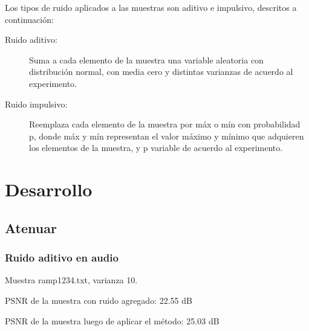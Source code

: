 \documentclass[a4paper,10pt,twoside]{article}
\begin{document}
Los tipos de ruido aplicados a las muestras son aditivo e impulsivo, descritos a continuación:

\begin{description}

\item[Ruido aditivo:]

Suma a cada elemento de la muestra una variable aleatoria con distribución normal, con media cero y distintas varianzas de acuerdo al experimento.

\item[Ruido impulsivo:]

Reemplaza cada elemento de la muestra por máx o mín con probabilidad p, donde máx y mín representan el valor máximo y mínimo que adquieren los elementos de la muestra, y p variable de acuerdo al experimento.

\end{description}








\section{Desarrollo}


\subsection{Atenuar}


\subsubsection{Ruido aditivo en audio}

Muestra ramp1234.txt, varianza 10.

PSNR de la muestra con ruido agregado: 22.55 dB

PSNR de la muestra luego de aplicar el método: 25.03 dB
\end{document}
